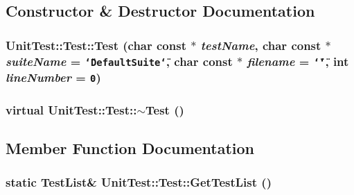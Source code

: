 \subsection{Constructor \& Destructor Documentation}
\hypertarget{class_unit_test_1_1_test_8c9765840746f8ddae4a2a52e0a50ec1}{
\subsubsection[{Test}]{\setlength{\rightskip}{0pt plus 5cm}UnitTest::Test::Test (char const $\ast$ {\em testName}, \/  char const $\ast$ {\em suiteName} = {\tt \char`\"{}DefaultSuite\char`\"{}}, \/  char const $\ast$ {\em filename} = {\tt \char`\"{}\char`\"{}}, \/  int {\em lineNumber} = {\tt 0})}}
\label{class_unit_test_1_1_test_8c9765840746f8ddae4a2a52e0a50ec1}


\hypertarget{class_unit_test_1_1_test_6fa9104f0b5b8c880e98a125e26c4989}{
\subsubsection[{$\sim$Test}]{\setlength{\rightskip}{0pt plus 5cm}virtual UnitTest::Test::$\sim$Test ()}}
\label{class_unit_test_1_1_test_6fa9104f0b5b8c880e98a125e26c4989}




\subsection{Member Function Documentation}
\hypertarget{class_unit_test_1_1_test_3e26319f255cd4919d5de1bbdf5b62b6}{
\subsubsection[{GetTestList}]{\setlength{\rightskip}{0pt plus 5cm}static {\bf TestList}\& UnitTest::Test::GetTestList ()}}
\label{class_unit_test_1_1_test_3e26319f255cd4919d5de1bbdf5b62b6}


